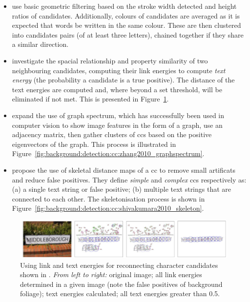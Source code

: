\begin{itemize}
  \item \citet{Epshtein:2010tj} use basic geometric filtering based on the stroke width detected and height ratios of candidates. Additionally, colours of candidates are averaged as it is expected that words be written in the same colour. These are then clustered into candidates pairs (of at least three letters), chained together if they share a similar direction.
  \item \citet{Zhang:2011cl} investigate the spacial relationship and property similarity of two neighbouring candidates, computing their link energies to compute \textit{text energy} (the probability a candidate is a true positive). The distance of the text energies are computed and, where beyond a set threshold, will be eliminated if not met. This is presented in Figure~\ref{fig:background:detection:cc:zhang2011_textenergy}.
  \item \citet{Zhang:2010wa} expand the use of graph spectrum, which has successfully been used in computer vision \citep{Sarkar:1996ig} to show image features in the form of a graph, use an adjacency matrix, then gather clusters of \glspl{cc} based on the positive eigenvectors of the graph. This process is illustrated in Figure~\ref{fig:background:detection:cc:zhang2010_graphspectrum}.
  \item \citet{Shivakumara:2011dn} propose the use of skeletal distance maps of a \gls{cc} to remove small artificats and reduce false positives. They define \textit{simple} and \textit{complex} \glspl{cc} respectively as: (a) a single text string or false positive; (b) multiple text strings that are connected to each other. The skeletonisation process is shown in Figure~\ref{fig:background:detection:cc:shivakumara2010_skeleton}.
\end{itemize}

\begin{figure}[p!]
  \centering
  \includegraphics[width=\textwidth]{images/background/zhang2011_textenergy}
  \caption[Text energy for connecting candidates back together]{Using link and text energies for reconnecting character candidates shown in \citet{Zhang:2011cl}. \textit{From left to right:} original image; all link energies determined in a given image (note the false positives of background foliage); text energies calculated; all text energies greater than 0.5.}
  \label{fig:background:detection:cc:zhang2011_textenergy}
\end{figure}

